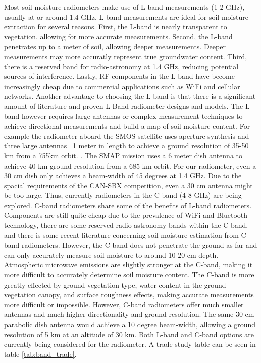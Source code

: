 \documentclass[12pt]{article}
\begin{document}
Most soil moisture radiometers make use of L-band measurements (1-2 GHz), usually at or around 1.4 GHz. L-band measurements are ideal for soil moisture extraction for several reasons. First, the L-band is nearly transparent to vegetation, allowing for more accurate measurements. Second, the L-band penetrates up to a meter of soil, allowing deeper measurements. Deeper measurements may more accuratly represent true groundwater content. Third, there is a reserved band for radio-astronomy at 1.4 GHz, reducing potential sources of interference. Lastly, RF components in the L-band have become increasingly cheap due to commercial applications such as WiFi and cellular networks. Another advantage to choosing the L-band is that there is a significant amount of literature and proven L-Band radiometer designs and models. The L-band however requires large antennas or complex measurement techniques to achieve directional measurements and build a map of soil moisture content. For example the radiometer aboard the SMOS satellite uses aperture synthesis and three large antennas ~1 meter in length to achieve a ground resolution of 35-50 km from a 755km orbit. \cite{Wigneron2010}. The SMAP mission uses a 6 meter dish antenna to achieve 40 km ground resolution from a 685 km orbit. \cite{entekhabi_njoku_oneill_spencer_jackson_entin_im_kellogg_2008}  For our radiometer, even a 30 cm dish only achieves a beam-width of 45 degrees at 1.4 GHz. Due to the spacial requirements of the CAN-SBX competition, even a 30 cm antenna might be too large. Thus, currently radiometers in the C-band (4-8 GHz) are being explored. C-band radiometers share some of the benefits of L-band radiometers. Components are still quite cheap due to the prevalence of WiFi and Bluetooth technology, there are some reserved radio-astronomy bands within the C-band, and there is some recent literature concerning soil moisture estimation from C-band radiometers. \cite{Description2000,jackson_gasiewski_oldak_klein_njoku_yevgrafov_christiani_bindlish_2002} However, the C-band does not penetrate the ground as far and can only accurately measure soil moisture to around 10-20 cm depth. Atmospheric microwave emissions are slightly stronger at the C-band, making it more difficult to accurately determine soil moisture content. The C-band is more greatly effected by ground vegetation type, water content in the ground vegetation canopy, and surface roughness effects, making accurate measurements more difficult or impossible. \cite{ulaby_fung_moore_1986} However, C-band radiometers offer much smaller antennas and much higher directionality and ground resolution. The same 30 cm parabolic dish antenna would achieve a 10 degree beam-width, allowing a ground resolution of 5 km at an altitude of 30 km. Both L-band and C-band options are currently being considered for the radiometer. A trade study table can be seen in table \ref{tab:band_trade}.
\end{document}
